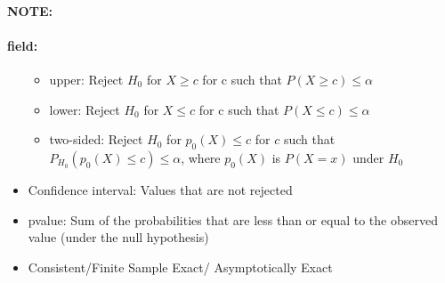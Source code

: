 \documentclass[12pt]{article}
\newenvironment{note}{\paragraph{NOTE:}}{}
\newenvironment{field}{\paragraph{field:}}{}
\begin{document}
\begin{note}
\begin{field}
\begin{itemize}
            \begin{itemize}
              \item upper: Reject $H_0$ for $X \geq c$ for c such that $P(X \geq c)\leq \alpha$
              \item lower: Reject $H_0$ for $X \leq c$ for c such that $P(X \leq c)\leq \alpha$
              \item two-sided: Reject $H_0$ for $p_0(X)\leq c$ for $c$ such that$P_{H_0}(p_0(X) \leq c)\leq \alpha$, where $p_0(X)$ is $P(X = x)$ under $H_0$
            \end{itemize}
      \item Confidence interval: Values that are not rejected
      \item pvalue: Sum of the probabilities that are less than or equal to the observed value (under the null hypothesis)
      \item Consistent/Finite Sample Exact/ Asymptotically Exact
    \end{itemize}
  \end{field}
\end{note}
\end{document}

